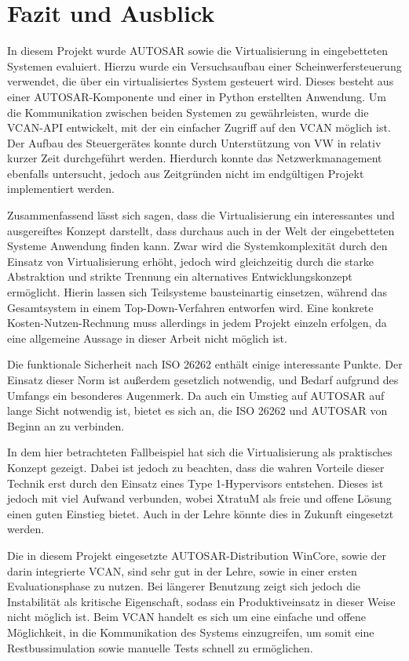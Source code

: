 \documentclass[
  a4paper,					    %
  twoside,
  DIV=calc,     				%
  bibliography=totoc,
  cleardoublepage=empty,
  ngerman,     					%
  final       					%
]{scrbook}
\begin{document}
\chapter{Fazit und Ausblick}
\label{sec:FazitAusblick}
In diesem Projekt wurde AUTOSAR sowie die Virtualisierung in eingebetteten Systemen evaluiert. Hierzu wurde ein Versuchsaufbau einer Scheinwerfersteuerung verwendet, die über ein virtualisiertes System gesteuert wird. Dieses besteht aus einer AUTOSAR-Komponente und einer in Python erstellten Anwendung. Um die Kommunikation zwischen beiden Systemen zu gewährleisten, wurde die VCAN-API entwickelt, mit der ein einfacher Zugriff auf den VCAN möglich ist. Der Aufbau des Steuergerätes konnte durch Unterstützung von VW in relativ kurzer Zeit durchgeführt werden. Hierdurch konnte das Netzwerkmanagement ebenfalls untersucht, jedoch aus Zeitgründen nicht im endgültigen Projekt implementiert werden.

Zusammenfassend lässt sich sagen, dass die Virtualisierung ein interessantes und ausgereiftes Konzept darstellt, dass durchaus auch in der Welt der eingebetteten Systeme Anwendung finden kann. Zwar wird die Systemkomplexität durch den Einsatz von Virtualisierung erhöht, jedoch wird gleichzeitig durch die starke Abstraktion und strikte Trennung ein alternatives Entwicklungskonzept ermöglicht. Hierin lassen sich Teilsysteme bausteinartig einsetzen, während das Gesamtsystem in einem Top-Down-Verfahren entworfen wird. Eine konkrete Kosten-Nutzen-Rechnung muss allerdings in jedem Projekt einzeln erfolgen, da eine allgemeine Aussage in dieser Arbeit nicht möglich ist.

Die funktionale Sicherheit nach ISO 26262 enthält einige interessante Punkte. Der Einsatz dieser Norm ist außerdem gesetzlich notwendig, und Bedarf aufgrund des Umfangs ein besonderes Augenmerk. Da auch ein Umstieg auf AUTOSAR auf lange Sicht notwendig ist, bietet es sich an, die ISO 26262 und AUTOSAR von Beginn an zu verbinden.

In dem hier betrachteten Fallbeispiel hat sich die Virtualisierung als praktisches Konzept gezeigt. Dabei ist jedoch zu beachten, dass die wahren Vorteile dieser Technik erst durch den Einsatz eines Type 1-Hypervisors entstehen. Dieses ist jedoch mit viel Aufwand verbunden, wobei XtratuM als freie und offene Lösung einen guten Einstieg bietet. Auch in der Lehre könnte dies in Zukunft eingesetzt werden.

Die in diesem Projekt eingesetzte AUTOSAR-Distribution WinCore, sowie der darin integrierte VCAN, sind sehr gut in der Lehre, sowie in einer ersten Evaluationsphase zu nutzen. Bei längerer Benutzung zeigt sich jedoch die Instabilität als kritische Eigenschaft, sodass ein Produktiveinsatz in dieser Weise nicht möglich ist. Beim VCAN handelt es sich um eine einfache und offene Möglichkeit, in die Kommunikation des Systems einzugreifen, um somit eine Restbussimulation sowie manuelle Tests schnell zu ermöglichen.
\end{document}

